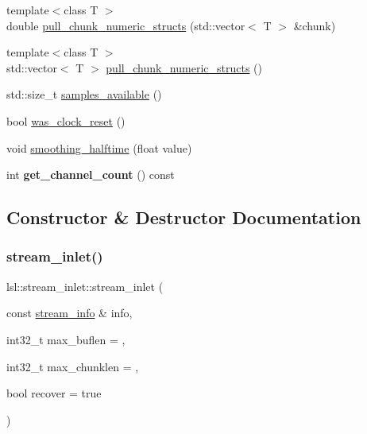 \begin{DoxyCompactItemize}
\item 
{\footnotesize template$<$class T $>$ }\\double \hyperlink{classlsl_1_1stream__inlet_ab14a0120e49dcd33f6df0716e6606810}{pull\+\_\+chunk\+\_\+numeric\+\_\+structs} (std\+::vector$<$ T $>$ \&chunk)
\item 
{\footnotesize template$<$class T $>$ }\\std\+::vector$<$ T $>$ \hyperlink{classlsl_1_1stream__inlet_a4a743ed5df78b05dcc038e73a1d4fb9b}{pull\+\_\+chunk\+\_\+numeric\+\_\+structs} ()
\item 
std\+::size\+\_\+t \hyperlink{classlsl_1_1stream__inlet_a8a4f5ff87d40a696ab4a5d74c03cd52b}{samples\+\_\+available} ()
\item 
bool \hyperlink{classlsl_1_1stream__inlet_ac3b8fa8912090ad6607b05cbb5848352}{was\+\_\+clock\+\_\+reset} ()
\item 
void \hyperlink{classlsl_1_1stream__inlet_a2774c1dbcf3fc7b17505e8814921d17c}{smoothing\+\_\+halftime} (float value)
\item 
\mbox{\label{classlsl_1_1stream__inlet_ad86702cf94e5b0b850a2f94a228e4f98}} 
int {\bfseries get\+\_\+channel\+\_\+count} () const
\end{DoxyCompactItemize}


\subsection{Constructor \& Destructor Documentation}
\mbox{\label{classlsl_1_1stream__inlet_a7c93b7d4fc053b2e3320841371b32919}} 
\subsubsection{\texorpdfstring{stream\+\_\+inlet()}{stream\_inlet()}}
{\footnotesize\ttfamily lsl\+::stream\+\_\+inlet\+::stream\+\_\+inlet (\begin{DoxyParamCaption}\item[{const \hyperlink{classlsl_1_1stream__info}{stream\+\_\+info} \&}]{info,  }\item[{int32\+\_\+t}]{max\+\_\+buflen = {},  }\item[{int32\+\_\+t}]{max\+\_\+chunklen = {},  }\item[{bool}]{recover = {\ttfamily true} }\end{DoxyParamCaption})\hspace{0.3cm}{\ttfamily [inline]}}

